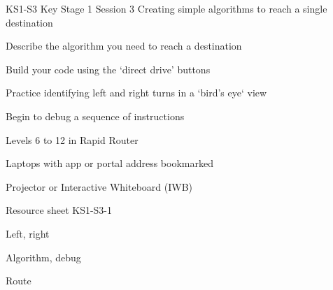 \documentclass{../../../lessonplan}
\begin{document}
\lessonplantitle
    {KS1-S3}
    {Key Stage 1 Session 3}
    {Creating simple algorithms to reach a single destination}

\preamble
    {
    \item Describe the algorithm you need to reach a destination
    \item Build your code using the `direct drive' buttons
    \item Practice identifying left and right turns in a `bird's eye` view
    \item Begin to debug a sequence of instructions
    }
    {
    \item Levels 6 to 12 in Rapid Router
    \item Laptops with app or portal address bookmarked
    \item Projector or Interactive Whiteboard (IWB)
    \item Resource sheet KS1-S3-1
    }
    {
    \item Left, right
    \item Algorithm, debug
    \item Route
    }
\end{document}
